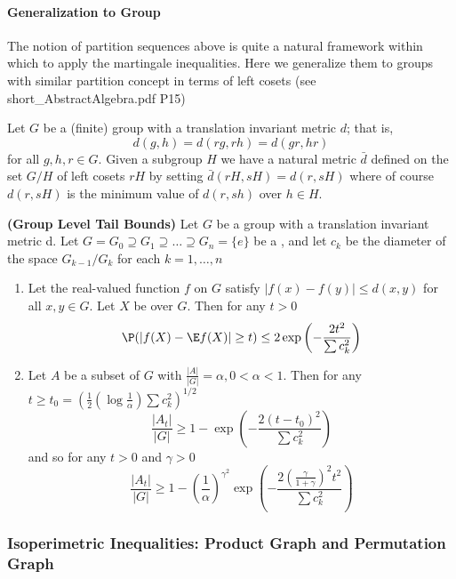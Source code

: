 \documentclass{article}
\newcommand{\bfs}[1]{\textbf{({#1})}}
\begin{document}
\paragraph{Generalization to Group}

The notion of partition sequences above is quite a natural framework
within which to apply the martingale inequalities. Here we generalize them to groups with similar  partition concept in terms of left cosets (see short\_AbstractAlgebra.pdf P15)

Let $G$ be a (finite) group with a translation invariant metric $d$; that is,
$$d ( g , h )= d ( rg , rh )= d ( gr , hr )$$ for all $g , h , r \in G .$ Given a subgroup $H$ we have a
natural metric $\bar{d}$ defined on the set $G/H$ of left cosets $rH$ by setting
$\bar{d}( r H , s H )= d ( r , s H )$ where of course $d ( r , s H )$ is the minimum value of $d ( r , sh )$ over $h \in H$.
\begin{thma}{\bfs{Group Level Tail Bounds}}
Let $G$ be a group with a translation invariant metric d. Let
$G = G_{0} \supseteq G _{1}  \supseteq \ldots  \supseteq G _{ n }=\{ e \}$ be a , and let $c _{ k }$ be
the diameter of the space $G _{ k -1} / G _{ k }$ for each $k =1, \ldots, n$
\begin{enumerate}
    \item Let the real-valued function $f$ on $G$ satisfy $| f ( x )- f ( y )| \leq d ( x , y )$ for all $x , y \in G$.
Let $X$ be  over $G$. Then for any $t >0$
$$
\P (| f ( X )- \E f ( X )| \geq t ) \leq 2 \exp \left(-\frac{2 t ^{2} }{ \sum c _{ k }^{2}}\right)
$$
\item Let $A$ be a subset of $G$ with $\frac{| A |}{| G |}=\alpha, 0<\alpha<1$. Then for any $t \geq t_{0}=\left(\frac{1}{2}\left(\log \frac{1}{\alpha}\right) \sum c_{k}^{2}\right)^{1 / 2}$
$$
\frac{\left| A _{ t }\right|}{| G |} \geq 1-\exp \left(-\frac{2\left( t - t _{0}\right)^{2} }{ \sum c _{ k }^{2}}\right)
$$
and so for any $t>0$ and $\gamma>0$
$$
\frac{\left|A_{t}\right|}{|G|} \geq 1-\left(\frac{1}{\alpha}\right)^{\gamma^{2}} \exp \left(-\frac{2\left(\frac{\gamma}{1+\gamma}\right)^{2} t^{2}}{ \sum c_{k}^{2}}\right)
$$
\end{enumerate}
\end{thma}

\subsubsection{Isoperimetric Inequalities: Product Graph and Permutation Graph}
\end{document}

